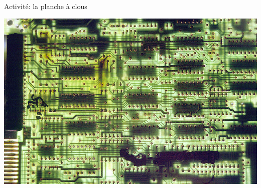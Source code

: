 \documentclass[final,hyperref={pdfpagelabels=false}]{beamer}
\begin{document}
\begin{frame}{Activité: la planche à clous}
  
  \centerline{\includegraphics[width=.7\linewidth]{img/electric_city.jpg}\label{img:electric:city}}
\end{frame}
\end{document}
